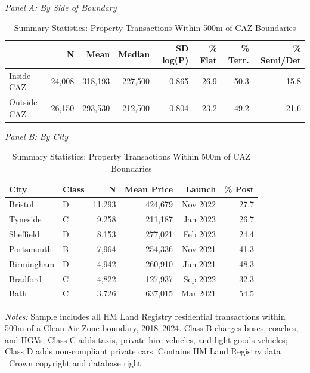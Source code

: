 \begin{table}[htbp]
\centering
\caption{Summary Statistics: Property Transactions Within 500m of CAZ Boundaries}
\label{tab:summary}
\small
\vspace{0.5em}
\textit{Panel A: By Side of Boundary}
\vspace{0.3em}

\begin{tabular}{lrrrrrrr}
\hline\hline
 & N & Mean & Median & SD log(P) & \% Flat & \% Terr. & \% Semi/Det \\
\hline
Inside CAZ & 24,008 & 318,193 & 227,500 & 0.865 & 26.9 & 50.3 & 15.8 \\
Outside CAZ & 26,150 & 293,530 & 212,500 & 0.804 & 23.2 & 49.2 & 21.6 \\
\hline
\end{tabular}

\vspace{1em}
\textit{Panel B: By City}
\vspace{0.3em}

\begin{tabular}{llrrrr}
\hline\hline
City & Class & N & Mean Price & Launch & \% Post \\
\hline
Bristol & D & 11,293 & 424,679 & Nov 2022 & 27.7 \\
Tyneside & C & 9,258 & 211,187 & Jan 2023 & 26.7 \\
Sheffield & D & 8,153 & 277,021 & Feb 2023 & 24.4 \\
Portsmouth & B & 7,964 & 254,336 & Nov 2021 & 41.3 \\
Birmingham & D & 4,942 & 260,910 & Jun 2021 & 48.3 \\
Bradford & C & 4,822 & 127,937 & Sep 2022 & 32.3 \\
Bath & C & 3,726 & 637,015 & Mar 2021 & 54.5 \\
\hline
\end{tabular}

\vspace{0.5em}
\begin{minipage}{0.95\textwidth}
\footnotesize
\textit{Notes:} Sample includes all HM Land Registry residential transactions within 500m of a Clean Air Zone boundary, 2018--2024. Class B charges buses, coaches, and HGVs; Class C adds taxis, private hire vehicles, and light goods vehicles; Class D adds non-compliant private cars. Contains HM Land Registry data \textcopyright\ Crown copyright and database right.
\end{minipage}
\end{table}
